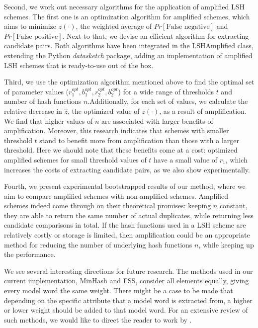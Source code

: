 Second, we work out necessary algorithms for the application of amplified LSH schemes. The first one is an optimization algorithm for amplified schemes, which aims to minimize $z(\cdot)$, the weighted average of $Pr[\text{False negative}]$ and $Pr[\text{False positive}]$. Next to that, we devise an efficient algorithm for extracting candidate pairs. Both algorithms have been integrated in the LSHAmplified class, extending the Python \textit{datasketch} package, adding an implementation of amplified LSH schemes that is ready-to-use out of the box. 

Third, we use the optimization algorithm mentioned above to find the optimal set of parameter values ($r_1^{opt},b_1^{opt},r_2^{opt},b_2^{opt}$) for a wide range of thresholds $t$ and number of hash functions $n$.Additionally, for each set of values, we calculate the relative decrease in $\hat{z}$, the optimized value of $z(\cdot)$, as a result of amplification. We find that higher values of $n$ are associated with larger benefits of amplification. Moreover, this research indicates that schemes with smaller threshold $t$ stand to benefit more from amplification than those with a larger threshold. Here we should note that these benefits come at a cost: optimized amplified schemes for small threshold values of $t$ have a small value of $r_1$, which increases the costs of extracting candidate pairs, as we also show experimentally.

Fourth, we present experimental bootstrapped results of our method, where we aim to compare amplified schemes with non-amplified schemes. Amplified schemes indeed come through on their theoretical promises: keeping $n$ constant, they are able to return the same number of actual duplicates, while returning less candidate comparisons in total. If the hash functions used in a LSH scheme are relatively costly or storage is limited, then amplification could be an appropriate method for reducing the number of underlying hash functions $n$, while keeping up the performance.

We see several interesting directions for future research. The methods used in our current implementation, MinHash and FSS, consider all elements equally, giving every model word the same weight. There might be a case to be made that depending on the specific attribute that a model word is extracted from, a higher or lower weight should be added to that model word. For an extensive review of such methods, we would like to direct the reader to work by \cite{WuLCGZ22}.

